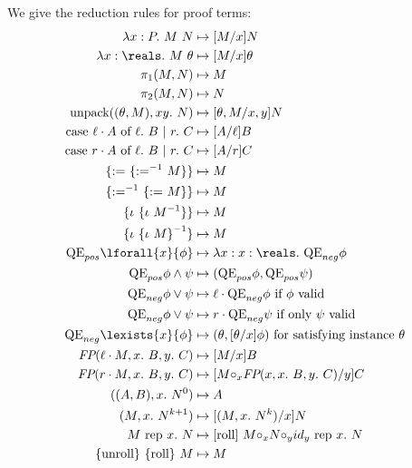 \documentclass[12pt]{cmuthesis}
\theoremstyle{definition}
\theoremstyle{remark}
\newcommand{\stepsto}{\mapsto}
\begin{document}
\newcommand{\esub}[3]{[#3/#2]#1}
We give the reduction rules for proof terms:
\begin{align*}
\eapp{\elam{P}{M}}{N} &\stepsto \esub{N}{x}{M}\\
\eapp{\elam{\reals}{M}}{\theta} &\stepsto \esub{\theta}{x}{M}\\
\eprojL{(M,N)} &\stepsto M\\
\eprojR{(M,N)} &\stepsto N\\
\eunpack{\etcons{\theta}{M}}{N} &\stepsto \esub{N}{x,y}{\theta,M}\\
\ecase{\einjL{A}}{B}{C} &\stepsto \esub{B}{\ell}{A}\\
\ecase{\einjR{A}}{B}{C} &\stepsto \esub{C}{r}{A}\\
\eAsgn{\eAsgninv{M}} &\stepsto M\\
\eAsgninv{\eAsgn{M}} &\stepsto M\\
\eSeq{\eSeqinv{M}} &\stepsto M\\
\eSeqinv{\eSeq{M}} &\stepsto M\\
\eQEpos{\lforall{x}{\phi}} &\stepsto \elam{x:\reals}{\eQEneg{\phi}}\\
\eQEpos{\phi \land \psi} &\stepsto \econs{\eQEpos{\phi}}{\eQEpos{\psi}}\\
\eQEneg{\phi \lor \psi} &\stepsto \einjL{\eQEneg{\phi}} \text{ if $\phi$ valid}\\
\eQEneg{\phi \lor \psi} &\stepsto \einjR{\eQEneg{\psi}} \text{ if only $\psi$ valid}\\
\eQEneg{\lexists{x}{\phi}} &\stepsto \etcons{\theta}{\esub{\phi}{x}{\theta}} \text{ for satisfying instance }\theta\\
\efp{\einjL{M}}{B}{C} &\stepsto \esub{B}{x}{M}\\
\efp{\einjR{M}}{B}{C} &\stepsto \esub{C}{y}{\emon{M}{\efp{x}{B}{C}}{x}}\\
\eloopelim{\econs{A}{B}}{N}{0} &\stepsto A\\
\eloopelim{M}{N}{k+1} &\stepsto \esub{N}{x}{\eloopelim{M}{N}{k}}\\
\erep{M}{N}{x} &\stepsto \ebroll{\emon{M}{\emon{N}{\erep{id_y}{N}{x}}{y}}{x}}\\
\eUnroll{\eRoll{M}} &\stepsto M
\end{align*}
\end{document}
